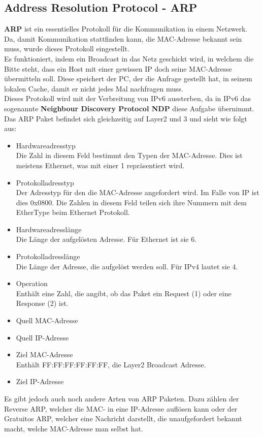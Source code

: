 \documentclass[12pt,a4paper]{report}
\begin{document}
\subsection{Address Resolution Protocol - ARP}\label{ssec:arp}
\textbf{ARP} ist ein essentielles Protokoll für die Kommunikation in einem Netzwerk. Da, damit Kommunikation stattfinden kann, die MAC-Adresse bekannt sein muss, wurde dieses Protokoll eingestellt.\\
Es funktioniert, indem ein Broadcast in das Netz geschickt wird, in welchem die Bitte steht, dass ein Host mit einer gewissen IP doch seine MAC-Adresse übermitteln soll. Diese speichert der PC, der die Anfrage gestellt hat, in seinem lokalen Cache, damit er nicht jedes Mal nachfragen muss.\\
Dieses Protokoll wird mit der Verbreitung von IPv6 aussterben, da in IPv6 das sogenannte \textbf{Neighbour Discovery Protocol NDP} diese Aufgabe übernimmt.\\

Das ARP Paket befindet sich gleichzeitig auf Layer2 und 3 und sieht wie folgt aus:\\
\begin{itemize}
\item Hardwareadresstyp\\
Die Zahl in diesem Feld bestimmt den Typen der MAC-Adresse. Dies ist meistens Ethernet, was mit einer 1 repräsentiert wird.
\item Protokolladresstyp\\
Der Adresstyp für den die MAC-Adresse angefordert wird. Im Falle von IP ist dies 0x0800. Die Zahlen in diesem Feld teilen sich ihre Nummern mit dem EtherType beim Ethernet Protokoll.
\item Hardwareadresslänge\\
Die Länge der aufgelösten Adresse. Für Ethernet ist sie 6.
\item Protokolladresslänge\\
Die Länge der Adresse, die aufgelöst werden soll. Für IPv4 lautet sie 4.
\item Operation\\
Enthält eine Zahl, die angibt, ob das Paket ein Request (1) oder eine Response (2) ist.
\item Quell MAC-Adresse
\item Quell IP-Adresse
\item Ziel MAC-Adresse\\
Enthält FF:FF:FF:FF:FF:FF, die Layer2 Broadcast Adresse.
\item Ziel IP-Adresse
\end{itemize}
Es gibt jedoch auch noch andere Arten von ARP Paketen. Dazu zählen der Reverse ARP, welcher die MAC- in eine IP-Adresse auflösen kann oder der Gratuitos ARP, welcher eine Nachricht darstellt, die unaufgefordert bekannt macht, welche MAC-Adresse man selbst hat.
\end{document}
